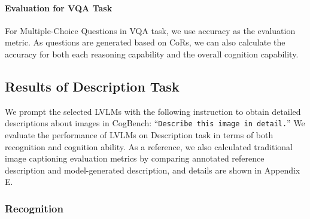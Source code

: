 



\paragraph{Evaluation for VQA Task}

For Multiple-Choice Questions in VQA task, we use accuracy as the evaluation metric. 
As questions are generated based on CoRs, we can also calculate the accuracy for both each reasoning capability and the overall cognition capability.

\subsection{Results of Description Task}


We prompt the selected LVLMs with the following instruction to obtain detailed descriptions about images in CogBench:
``\texttt{Describe this image in detail.}''
We evaluate the performance of LVLMs on Description task in terms of both recognition and cognition ability.
As a reference, we also calculated traditional image captioning evaluation metrics by comparing annotated reference description and model-generated description, and details are shown in Appendix E. %

\subsubsection{Recognition}



